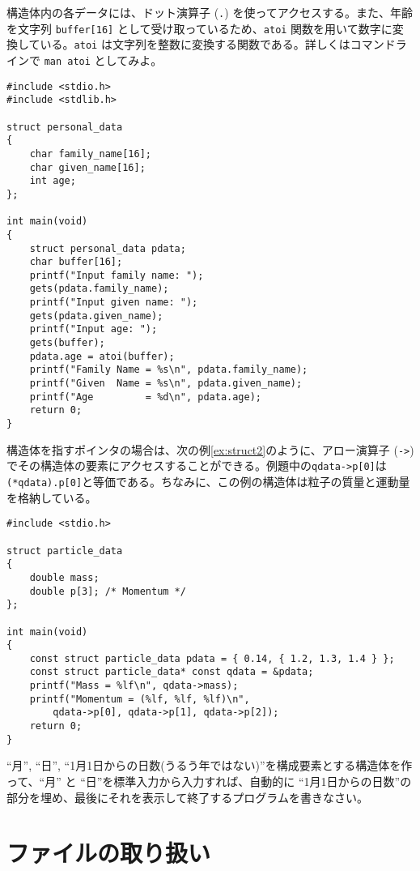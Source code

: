 構造体内の各データには、ドット演算子 (\texttt{.}) を使ってアクセスする。また、年齢を文字列 \texttt{buffer[16]} として受け取っているため、\texttt{atoi} 関数を用いて数字に変換している。\texttt{atoi} は文字列を整数に変換する関数である。詳しくはコマンドラインで \texttt{man atoi} としてみよ。
\begin{reidai}\label{ex:struct1}
    \begin{verbatim}
#include <stdio.h>
#include <stdlib.h>

struct personal_data
{
    char family_name[16];
    char given_name[16];
    int age;
};

int main(void)
{
    struct personal_data pdata;
    char buffer[16];
    printf("Input family name: ");
    gets(pdata.family_name);
    printf("Input given name: ");
    gets(pdata.given_name);
    printf("Input age: ");
    gets(buffer);
    pdata.age = atoi(buffer);
    printf("Family Name = %s\n", pdata.family_name);
    printf("Given  Name = %s\n", pdata.given_name);
    printf("Age         = %d\n", pdata.age);
    return 0;
}
\end{verbatim}
\end{reidai} \noindent
構造体を指すポインタの場合は、次の例\ref{ex:struct2}のように、アロー演算子 (\texttt{->}) でその構造体の要素にアクセスすることができる。例題中の\texttt{qdata->p[0]}は\texttt{(*qdata).p[0]}と等価である。ちなみに、この例の構造体は粒子の質量と運動量を格納している。
\begin{reidai}\label{ex:struct2}
    \begin{verbatim}
#include <stdio.h>

struct particle_data
{
    double mass;
    double p[3]; /* Momentum */
};

int main(void)
{
    const struct particle_data pdata = { 0.14, { 1.2, 1.3, 1.4 } };
    const struct particle_data* const qdata = &pdata;
    printf("Mass = %lf\n", qdata->mass);
    printf("Momentum = (%lf, %lf, %lf)\n",
        qdata->p[0], qdata->p[1], qdata->p[2]);
    return 0;
}
\end{verbatim}
\end{reidai}

\begin{renshuu}\label{prob:7-1}
    ``月'', ``日'', ``1月1日からの日数(うるう年ではない)''を構成要素とする構造体を作って、``月'' と ``日''を標準入力から入力すれば、自動的に ``1月1日からの日数''の部分を埋め、最後にそれを表示して終了するプログラムを書きなさい。
\end{renshuu}

\section{ファイルの取り扱い}

